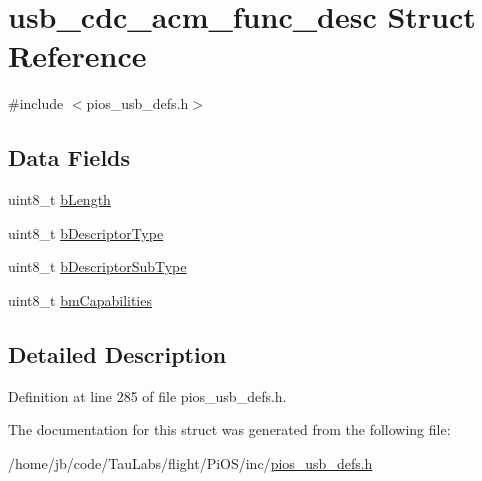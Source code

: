 \hypertarget{structusb__cdc__acm__func__desc}{\section{usb\-\_\-cdc\-\_\-acm\-\_\-func\-\_\-desc \-Struct \-Reference}
\label{structusb__cdc__acm__func__desc}
}


{\ttfamily \#include $<$pios\-\_\-usb\-\_\-defs.\-h$>$}

\subsection*{\-Data \-Fields}
\begin{DoxyCompactItemize}
\item 
uint8\-\_\-t \hyperlink{group___p_i_o_s___u_s_b___d_e_f_s_gacda28d39ca47f4d77a24b7617ac2d693}{b\-Length}
\item 
uint8\-\_\-t \hyperlink{group___p_i_o_s___u_s_b___d_e_f_s_ga10040b1863323e237a9c86859baaecb4}{b\-Descriptor\-Type}
\item 
uint8\-\_\-t \hyperlink{group___p_i_o_s___u_s_b___d_e_f_s_ga08c4c22a13b05fac74e5f42a8a5bde68}{b\-Descriptor\-Sub\-Type}
\item 
uint8\-\_\-t \hyperlink{group___p_i_o_s___u_s_b___d_e_f_s_gae29c71f4304b1f38e5ffcaf34ec9b182}{bm\-Capabilities}
\end{DoxyCompactItemize}


\subsection{\-Detailed \-Description}


\-Definition at line 285 of file pios\-\_\-usb\-\_\-defs.\-h.



\-The documentation for this struct was generated from the following file\-:\begin{DoxyCompactItemize}
\item 
/home/jb/code/\-Tau\-Labs/flight/\-Pi\-O\-S/inc/\hyperlink{pios__usb__defs_8h}{pios\-\_\-usb\-\_\-defs.\-h}\end{DoxyCompactItemize}
